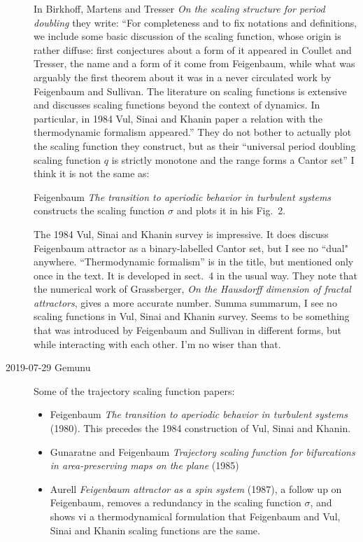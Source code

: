 \begin{description}
In Birkhoff, Martens and Tresser
{\em On the scaling structure for period doubling} they write:
``For  completeness  and  to fix notations  and  definitions,  we include
some  basic discussion  of the scaling function,  whose origin is rather
diffuse:  first  conjectures  about a form  of it  appeared  in Coullet
and Tresser, the name and a  form  of it  come from
Feigenbaum, while what  was  arguably the first theorem
about  it was in a never circulated  work by Feigenbaum  and  Sullivan.
The literature  on  scaling functions  is  extensive  and  discusses
scaling functions  beyond  the context  of dynamics.  In  particular,  in
1984 Vul, Sinai and Khanin paper  a  relation  with  the
thermodynamic  formalism  appeared.''
They do not bother to actually plot the scaling function they construct,
but as their ``universal period doubling scaling function $q$ is strictly
monotone and the range forms a Cantor set'' I think it is not the same
as:

Feigenbaum {\em The transition to aperiodic behavior in
turbulent systems} constructs the scaling function $\sigma$ and plots it in
his Fig.~2.

The 1984 Vul, Sinai and Khanin survey is impressive. It does
discuss Feigenbaum attractor as a binary-labelled Cantor set, but I see
no ``dual" anywhere. ``Thermodynamic formalism'' is in the title, but
mentioned only once in the text. It is developed in sect.~4 in the usual
way. They note that the numerical work of Grassberger,
{\em On the {Hausdorff} dimension of fractal attractors}, gives a more
accurate number. Summa summarum, I see no scaling functions in Vul, Sinai
and Khanin survey. Seems to be something that was introduced
by Feigenbaum and Sullivan in different forms, but while interacting with
each other. I'm no wiser than that.

\item[2019-07-29 Gemunu]
Some of the trajectory scaling function papers:
\begin{itemize}
  \item
Feigenbaum
{\em The transition to aperiodic behavior in turbulent systems} (1980).
This precedes the 1984 construction
of Vul, Sinai and Khanin.
  \item
Gunaratne and Feigenbaum {\em Trajectory scaling function
for bifurcations in area-preserving maps on the plane} (1985)
  \item
Aurell
{\em Feigenbaum attractor as a spin system} (1987),
a follow up on Feigenbaum, removes a redundancy in
the scaling function $\sigma$, and shows vi a thermodynamical formulation
that Feigenbaum and Vul, Sinai and Khanin
scaling functions are the same.
\end{itemize}


\end{description}
